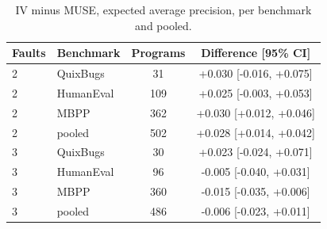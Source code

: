 \begin{table}[t]
\centering
\caption{IV minus MUSE, expected average precision, per benchmark and pooled.}
\label{tab:muse}
\begin{tabular}{llcc}
\toprule
Faults & Benchmark & Programs & Difference [95\% CI] \\
\midrule
2 & QuixBugs & 31 & +0.030 [-0.016, +0.075] \\
2 & HumanEval & 109 & +0.025 [-0.003, +0.053] \\
2 & MBPP & 362 & +0.030 [+0.012, +0.046] \\
2 & pooled & 502 & +0.028 [+0.014, +0.042] \\
3 & QuixBugs & 30 & +0.023 [-0.024, +0.071] \\
3 & HumanEval & 96 & -0.005 [-0.040, +0.031] \\
3 & MBPP & 360 & -0.015 [-0.035, +0.006] \\
3 & pooled & 486 & -0.006 [-0.023, +0.011] \\
\bottomrule
\end{tabular}
\end{table}
